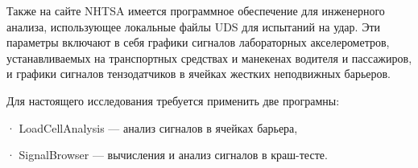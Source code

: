  Также 	на сайте NHTSA имеется программное обеспечение  для инженерного анализа, использующее локальные файлы UDS для испытаний на удар. Эти параметры включают в себя графики сигналов 	лабораторных акселерометров, устанавливаемых на транспортных средствах 	и манекенах водителя и пассажиров, и графики сигналов тензодатчиков в ячейках жестких неподвижных барьеров. %
%	

Для настоящего исследования требуется применить две програмны:

· LoadCellAnalysis — анализ сигналов в ячейках барьера,

· SignalBrowser — вычисления и анализ сигналов в краш-тесте.




